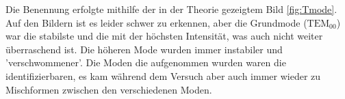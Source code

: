 \newpage
Die Benennung erfolgte mithilfe der in der Theorie gezeigtem Bild \ref{fig:Tmode}.\\
Auf den Bildern ist es leider schwer zu erkennen, aber die Grundmode ($\text{TEM}_{00}$) 
war die stabilste und die mit der höchsten Intensität, was auch nicht weiter überraschend ist. 
Die höheren Mode wurden immer instabiler und 'verschwommener'. Die Moden die aufgenommen wurden 
waren die identifizierbaren, es kam während dem Versuch aber auch immer wieder zu Mischformen zwischen
den verschiedenen Moden. 
